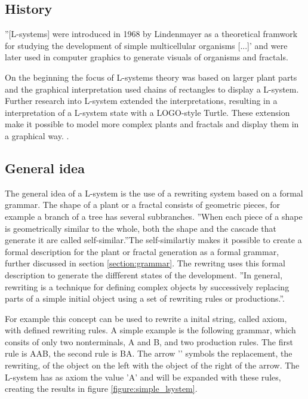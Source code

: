 \documentclass[english]{cpp-hmwk}
\begin{document}
\subsection{History}
\label{section:history}
''[L-systems] were introduced in 1968 by Lindenmayer as a theoretical framwork for studying the development of simple multicellular organisms [...]'\cite[Preface, p.~VI]{prusinkiewiczp.lindenmayera.2004} and were later used in computer graphics to generate visuals of organisms and fractals.

On the beginning the focus of L-systems theory was based on larger plant parts and the graphical interpretation used chains of rectangles to display a L-system. Further research into L-system extended the interpretations, resulting in a interpretation of a L-system state with a LOGO-style Turtle. These extension make it possible to model more complex plants and fractals and display them in a graphical way. \cite[Cf. Chapter 1.3, p.~6]{prusinkiewiczp.lindenmayera.2004}.

\subsection{General idea}
\label{section:gerneralidea}
The general idea of a L-system is the use of a rewriting system based on a formal grammar. The shape of a plant or a fractal consists of geometric pieces, for example a branch of a tree has several subbranches. ''When each piece of a shape is geometrically similar to the whole, both the shape and the cascade that generate it are called self-similar.''\cite[Chapter 6, p.~34]{benoitmandelbrot1982}The self-similartiy makes it possible to create a formal description for the plant or fractal generation as a formal grammar, further discussed in  section \ref{section:grammar}. The rewritng uses this formal description to generate the diffferent states of the development. ''In general, rewriting is a technique for defining complex objects by successively replacing parts of a simple initial object using a set of rewriting rules or productions.''\cite[Chapter 1.1,  p.~1]{prusinkiewiczp.lindenmayera.2004}. 

For example this concept can be used to rewrite a inital string, called axiom, with defined rewriting rules.
A simple example is the following grammar, which consits of only two nonterminals, A and B, and two production rules. 
The first rule is A\rightarrow AB, the second rule is B\rightarrow A. The arrow '\rightarrow' symbols the replacement, the rewriting, of the object on the left with the object of the right of the arrow.
The L-system has as axiom the value 'A' and will be expanded with these rules, creating the results in figure \ref{figure:simple_lsystem}.
\end{document}
